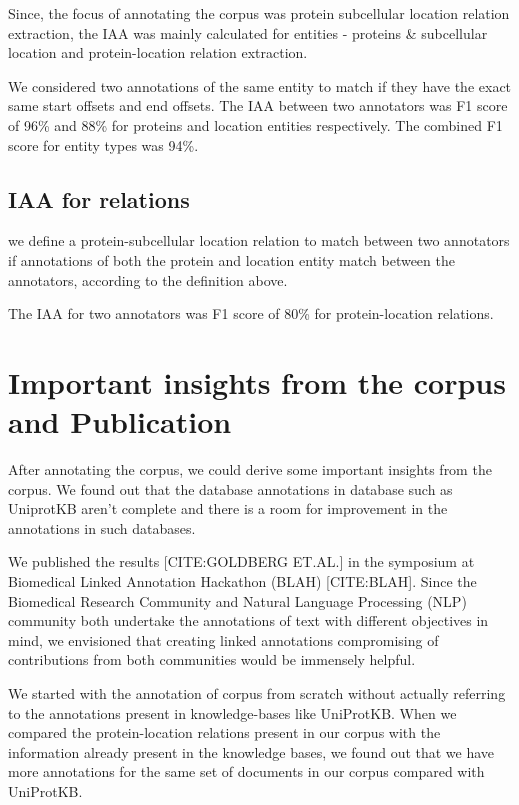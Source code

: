 Since, the focus of annotating the corpus was protein subcellular location relation extraction, the IAA was mainly calculated for entities - proteins \& subcellular location and protein-location relation extraction.

We considered two annotations of the same entity to match if they have the exact same start offsets and end offsets. The IAA between two annotators was F1 score of  96\% and 88\% for proteins and location entities respectively. The combined F1 score for entity types was 94\%.

\subsection*{IAA for relations}

we define a protein-subcellular location relation to match between two annotators if annotations of both the protein and location entity match between the annotators, according to the definition above.

The IAA for two annotators was F1 score of 80\% for protein-location relations.

\section{Important insights from the corpus and Publication}

After annotating the corpus, we could derive some important insights from the corpus. We found out that the database annotations in database such as UniprotKB aren't complete and there is a room for improvement in the annotations in such databases.

We published the results [CITE:GOLDBERG ET.AL.] in the symposium at Biomedical Linked Annotation Hackathon (BLAH) [CITE:BLAH]. Since the Biomedical Research Community and Natural Language Processing (NLP) community both undertake the annotations of text with different objectives in mind, we envisioned that creating linked annotations compromising of contributions from both communities would be immensely helpful. 

We started with the annotation of corpus from scratch without actually referring to the annotations present in knowledge-bases like UniProtKB. When we compared the protein-location relations present in our corpus with the information already present in the knowledge bases, we found out that we have more annotations for the same set of documents in our corpus compared with UniProtKB.

